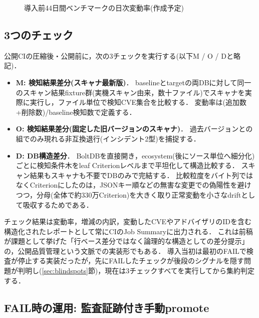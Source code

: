 \documentclass{css}
\begin{document}
\begin{figure}[tb]
\centering
{}
\caption{導入前44日間ベンチマークの日次変動率(作成予定)}
\label{fig:benchmark}
\end{figure}

\subsection{3つのチェック}
\label{sec:checks}

公開CIの圧縮後・公開前に，次の3チェックを実行する(以下M / O / Dと略記)．

\begin{itemize}
\item \textbf{M: 検知結果差分(スキャナ最新版)}．
baselineとtargetの両DBに対して同一のスキャン結果fixture群(実機スキャン由来，数十ファイル)でスキャナを実際に実行し，ファイル単位で検知CVE集合を比較する．
変動率は(追加数+削除数)/baseline検知数で定義する．
\item \textbf{O: 検知結果差分(固定した旧バージョンのスキャナ)}．
過去バージョンとの組でのみ現れる非互換退行(インシデント2型)を捕捉する．
\item \textbf{D: DB構造差分}．
BoltDBを直接開き，ecosystem(後にソース単位へ細分化)ごとに検知条件木をleaf Criterionレベルまで平坦化して構造比較する．
スキャン結果もスキャナも不要でDBのみで完結する．
比較粒度をバイト列ではなくCriterionにしたのは，JSONキー順などの無害な変更での偽陽性を避けつつ，分母(全体で約330万Criterion)を大きく取り正常変動を小さなdriftとして吸収するためである．
\end{itemize}

チェック結果は変動率，増減の内訳，変動したCVEやアドバイザリのIDを含む構造化されたレポートとして常にCIのJob Summaryに出力される．
これは前稿が課題として挙げた「行ベース差分ではなく論理的な構造としての差分提示」\cite{nakaoka2025}の，公開品質管理という文脈での実装形でもある．
導入当初は最初のFAILで検査が停止する実装だったが，先にFAILしたチェックが後段のシグナルを隠す問題が判明し(\ref{sec:blindspots}節)，現在は3チェックすべてを実行してから集約判定する．

\subsection{FAIL時の運用: 監査証跡付き手動promote}
\label{sec:promote}
\end{document}
